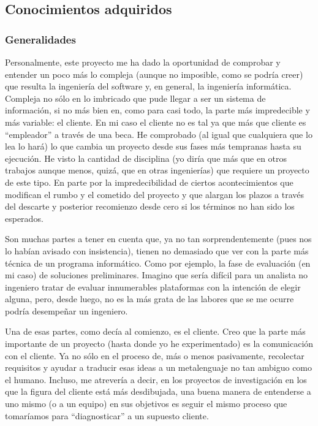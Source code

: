 \subsection{Conocimientos adquiridos}
\subsubsection{Generalidades}
Personalmente, este proyecto me ha dado la oportunidad de comprobar y entender un poco más lo compleja (aunque no imposible, como se podría creer) que resulta la ingeniería del software y, en general, la ingeniería informática. Compleja no sólo en lo imbricado que pude llegar a ser un sistema de información, si no más bien en, como para casi todo, la parte más impredecible y más variable: el cliente. En mi caso el cliente no es tal ya que más que cliente es ``empleador'' a través de una beca. He comprobado (al igual que cualquiera que lo lea lo hará) lo que cambia un proyecto desde sus fases más tempranas hasta su ejecución. He visto la cantidad de disciplina (yo diría que más que en otros trabajos aunque menos, quizá, que en otras ingenierías) que requiere un proyecto de este tipo. En parte por la impredecibilidad de ciertos acontecimientos que modifican el rumbo y el cometido del proyecto y que alargan los plazos a través del descarte y posterior recomienzo desde cero si los términos no han sido los esperados.
\par Son muchas partes a tener en cuenta que, ya no tan sorprendentemente (pues nos lo habían avisado con insistencia), tienen no demasiado que ver con la parte más técnica de un programa informático. Como por ejemplo, la fase de evaluación (en mi caso) de soluciones preliminares. Imagino que sería difícil para un analista no ingeniero tratar de evaluar innumerables plataformas con la intención de elegir alguna, pero, desde luego, no es la más grata de las labores que se me ocurre podría desempeñar un ingeniero.
\par Una de esas partes, como decía al comienzo, es el cliente. Creo que la parte más importante de un proyecto (hasta donde yo he experimentado) es la comunicación con el cliente. Ya no sólo en el proceso de, más o menos pasivamente, recolectar requisitos y ayudar a traducir esas ideas a un metalenguaje no tan ambiguo como el humano. Incluso, me atrevería a decir, en los proyectos de investigación en los que la figura del cliente está más desdibujada, una buena manera de entenderse a uno mismo (o a un equipo) en sus objetivos es seguir el mismo proceso que tomaríamos para ``diagnosticar'' a un supuesto cliente.

